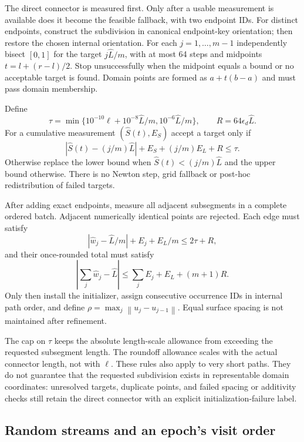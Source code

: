 \documentclass[11pt,letterpaper]{article}
\newcommand{\norm}[1]{\left\lVert#1\right\rVert}
\begin{document}
The direct connector is measured first. Only after a usable measurement is
available does it become the feasible fallback, with two endpoint IDs. For
distinct endpoints, construct the subdivision in canonical endpoint-key
orientation; then restore the chosen internal orientation. For each
$j=1,\ldots,m-1$ independently bisect $[0,1]$ for the target $j\widehat L/m$,
with at most 64 steps and midpoints $t=l+(r-l)/2$. Stop unsuccessfully when
the midpoint equals a bound or no acceptable target is found. Domain points
are formed as $a+t(b-a)$ and must pass domain membership.

Define
\[
 \tau=\min\{10^{-10}\ell+10^{-8}\widehat L/m,10^{-6}\widehat L/m\},\qquad
 R=64\epsilon_d\widehat L.
\]
For a cumulative measurement $(\widehat S(t),E_S)$ accept a target only if
\[
 |\widehat S(t)-(j/m)\widehat L|+E_S+(j/m)E_L+R\le\tau.
\]
Otherwise replace the lower bound when $\widehat S(t)<(j/m)\widehat L$ and
the upper bound otherwise. There is no Newton step, grid fallback or
post-hoc redistribution of failed targets.

After adding exact endpoints, measure all adjacent subsegments in a complete
ordered batch. Adjacent numerically identical points are rejected. Each edge
must satisfy
\[
 |\widehat w_j-\widehat L/m|+E_j+E_L/m\le2\tau+R,
\]
and their once-rounded total must satisfy
\[
 \left|\sum_j\widehat w_j-\widehat L\right|
 \le\sum_j E_j+E_L+(m+1)R.
\]
Only then install the initializer, assign consecutive occurrence IDs in
internal path order, and define $\rho=\max_j\norm{u_j-u_{j-1}}$.
Equal surface spacing is not maintained after refinement.

The cap on $\tau$ keeps the absolute length-scale allowance from exceeding
the requested subsegment length. The roundoff allowance scales with the
actual connector length, not with $\ell$. These rules also apply to very
short paths. They do not guarantee that the requested subdivision exists
in representable domain coordinates: unresolved targets, duplicate points,
and failed spacing or additivity checks still retain the direct connector
with an explicit initialization-failure label.

\subsection{Random streams and an epoch's visit order}
\label{sec:cpp-random}
\end{document}
